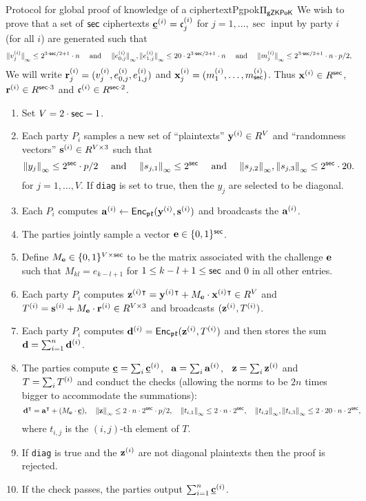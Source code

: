 \begin{Boxfig}{Protocol for global proof of knowledge of a ciphertext}{Pgpok}{$\Pi_\mathsf{gZKPoK}$}
We wish to prove that a set of $\mathsf{sec}$ ciphertexts $\underline{\mathbf{c}}^{(i)}=\mathfrak{c}^{(i)}_j$ for $j=1,\ldots, \sec$
input by party $i$ (for all $i$) are generated such that
\[ {\Vert v^{(i)}_j \Vert}_\infty \le 2^{3 \cdot \mathsf{sec}/2+1} \cdot n \quad 
    \mbox{  and  } \quad
   {\Vert e^{(i)}_{0,j} \Vert}_\infty, {\Vert e^{(i)}_{1,j} \Vert}_\infty \le 20 \cdot 2^{3 \cdot \mathsf{sec}/2+1} \cdot n \quad
    \mbox{  and  } \quad
   {\Vert m^{(i)}_j \Vert}_\infty \le 2^{3 \cdot \mathsf{sec}/2+1} \cdot n \cdot p/2,
\]
We will write $\mathbf{r}^{(i)}_j=(v^{(i)}_j, e^{(i)}_{0,j}, e^{(i)}_{1,j})$
and $\mathbf{x}^{(i)}_j=(m^{(i)}_1,\ldots,m^{(i)}_{\mathsf{sec}})$.
Thus $\mathbf{x}^{(i)} \in R^{\mathsf{sec}}$, $\mathbf{r}^{(i)} \in R^{\mathsf{sec} \cdot 3}$ and $\mathfrak{c}^{(i)}\in R^{\mathsf{sec} \cdot 2}$.
\begin{enumerate}
\item Set $V= 2 \cdot \mathsf{sec}-1$.
\item \label{stage1} 
Each party $P_i$ samples a new set of ``plaintexts'' $\mathbf{y}^{(i)} \in R^V$ and ``randomness vectors''
$\mathbf{s}^{(i)} \in R^{V \times 3} $ such that
\[ {\Vert y_j \Vert}_\infty \le 2^{\mathsf{sec}} \cdot p/2 \quad \mbox{  and  } \quad
   {\Vert s_{j,1} \Vert}_\infty \le 2^{\mathsf{sec}} \quad \mbox{  and   } \quad
   {\Vert s_{j,2} \Vert}_\infty, {\Vert s_{j,3} \Vert}_\infty \le 2^{\mathsf{sec}} \cdot 20.
\]
for $j=1,\ldots,V$.
If \verb+diag+ is set to true, then the $y_j$ are selected to be diagonal.
\item Each $P_i$ computes $\mathbf{a}^{(i)} \leftarrow \mathsf{Enc}_{\mathfrak{pk}}(\mathbf{y}^{(i)},\mathbf{s}^{(i)})$ and broadcasts the $\mathbf{a}^{(i)}$.
\item The parties jointly sample a vector $\mathbf{e} \in \{0,1\}^{\mathsf{sec}}$.
\item Define $M_{\mathbf{e}} \in \{0,1\}^{V \times \mathsf{sec}}$ to be the matrix associated with the challenge $\mathbf{e}$ 
such that $M_{kl} = e_{k-l+1}$ for $1 \leq k-l+1 \leq \mathsf{sec}$ and $0$ in all other entries.
\item Each party $P_i$ computes $\mathbf{z}^{(i)}{}^{\intercal} = \mathbf{y}^{(i)}{}^{\intercal} + M_{\mathbf{e}} \cdot \mathbf{x}^{(i)}{}^{\intercal} \in R^{V}$ 
and $T^{(i)}=\mathbf{s}^{(i)} + M_{\mathbf{e}} \cdot \mathbf{r}^{(i)} \in R^{V \times 3}$ and broadcasts $(\mathbf{z}^{(i)},T^{(i)})$.
\item \label{stage20} Each party $P_i$ computes $\mathbf{d}^{(i)} = \mathsf{Enc}_{\mathfrak{pk}}(\mathbf{z}^{(i)}, T^{(i)})$ 
and then stores the sum $\mathbf{d} = \sum_{i=1}^n \mathbf{d}^{(i)}$.
\item \label{stage21} 
The parties compute $\underline{\mathbf{c}} =\sum_i \underline{\mathbf{c}}^{(i)}$,~ $\mathbf{a} = \sum_i \mathbf{a}^{(i)}$,~ $\mathbf{z} = \sum_i \mathbf{z}^{(i)}$ and $T = \sum_i T^{(i)}$ and 
conduct the checks (allowing the norms to be $2n$ times bigger to accommodate the summations):
\[\mathbf{d}^{\intercal} = \mathbf{a}^{\intercal} + (M_{\mathbf{e}} \cdot \underline{\mathbf{c}}), \quad
  {\Vert \mathbf{z}\Vert}_\infty \leq 2 \cdot n \cdot 2^{\mathsf{sec}} \cdot p/2, \quad
  {\Vert t_{i,1} \Vert}_\infty \leq 2 \cdot n \cdot 2^{\mathsf{sec}}, \quad
  {\Vert t_{i,2} \Vert}_\infty, {\Vert t_{i,3} \Vert}_\infty \leq 2 \cdot 20 \cdot n \cdot 2^{\mathsf{sec}}, \quad
\]
where $t_{i,j}$ is the $(i,j)$-th element of $T$.
\item If \verb+diag+ is true and the $\mathbf{z}^{(i)}$ are not diagonal plaintexts then the
proof is rejected.
\item If the check passes, the parties output $\sum_{i=1}^{n} \underline{\mathbf{c}}^{(i)}$.
  \end{enumerate}
\end{Boxfig}
